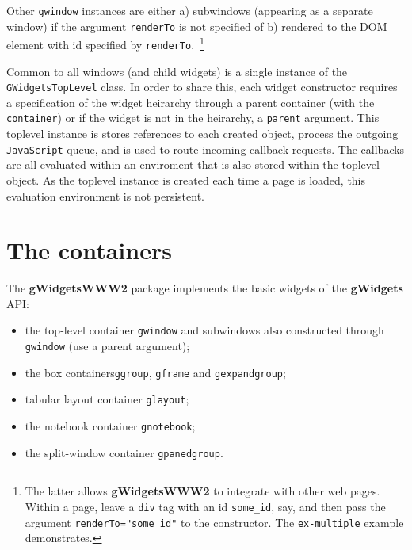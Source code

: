 \documentclass[12pt]{article}
\newcommand{\pkg}[1]{\textbf{#1}}
\newcommand{\code}[1]{\texttt{#1}}
\newcommand{\proglang}[1]{\code{#1}}
\newcommand{\javascript}{\proglang{JavaScript}}
\begin{document}
Other \code{gwindow} instances are either a) subwindows (appearing as
a separate window) if the argument \code{renderTo} is not specified of
b) rendered to the DOM element with id specified by
\code{renderTo}.~\footnote{The latter allows \pkg{gWidgetsWWW2} to
  integrate with other web pages. Within a page, leave a \code{div}
  tag with an id \code{some\_id}, say, and then pass the argument
  \code{renderTo="some\_id"} to the constructor. The
  \code{ex-multiple} example demonstrates.  }

Common to all windows (and child widgets) is a single instance of the
\code{GWidgetsTopLevel} class. In order to share this, each widget
constructor requires a specification of the widget heirarchy through a
parent container (with the \code{container}) or if the widget is not
in the heirarchy, a \code{parent} argument. This toplevel instance is
stores references to each created object, process the outgoing
\javascript{} queue, and is used to route incoming callback requests. The
callbacks are all evaluated within an enviroment that is also stored
within the toplevel object.  As the toplevel instance is created each
time a page is loaded, this evaluation environment is not persistent.



\section{The containers}
\label{sec:containers}

The \pkg{gWidgetsWWW2} package implements the basic widgets of the
\pkg{gWidgets} API:
\begin{itemize}
\item the top-level container \code{gwindow} and subwindows
also constructed through \code{gwindow} (use a parent argument);
\item the box containers\code{ggroup}, \code{gframe} and \code{gexpandgroup};
\item tabular layout container \code{glayout};
\item the notebook container \code{gnotebook};
\item the split-window container \code{gpanedgroup}.
\end{itemize}
\end{document}
